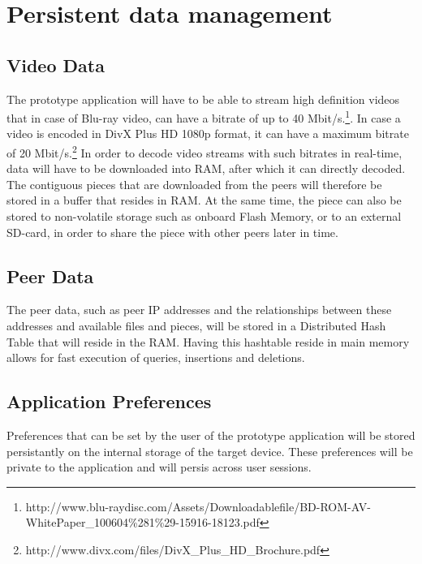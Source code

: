 \section{Persistent data management}
\label{sec:perdata}
\subsection{Video Data}
The prototype application will have to be able to stream high definition videos that in case of Blu-ray video, can have a bitrate of up to 40 Mbit/s.\footnote{http://www.blu-raydisc.com/Assets/Downloadablefile/BD-ROM-AV-WhitePaper_100604\%281\%29-15916-18123.pdf}. In case a video is encoded in DivX Plus HD 1080p format, it can have a maximum bitrate of 20 Mbit/s.\footnote{http://www.divx.com/files/DivX_Plus_HD_Brochure.pdf} In order to decode video streams with such bitrates in real-time, data will have to be downloaded into RAM, after which it can directly decoded. The contiguous pieces that are downloaded from the peers will therefore be stored in a buffer that resides in RAM. At the same time, the piece can also be stored to non-volatile storage such as onboard Flash Memory, or to an external SD-card, in order to share the piece with other peers later in time.
\subsection{Peer Data}
The peer data, such as peer IP addresses and the relationships between these addresses and available files and pieces, will be stored in a Distributed Hash Table that will reside in the RAM. Having this hashtable reside in main memory allows for fast execution of queries, insertions and deletions.
\subsection{Application Preferences}
Preferences that can be set by the user of the prototype application will be stored persistantly on the internal storage of the target device. These preferences will be private to the application and will persis across user sessions.



